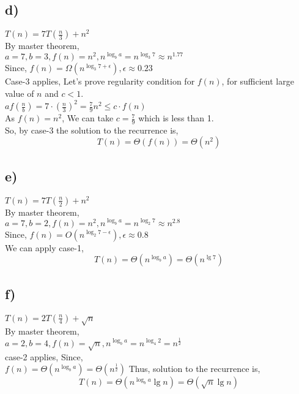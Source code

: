 \documentclass[a4paper, 11pt]{article}
\begin{document}
\subsection*{d)}
$T(n) =7 T(\frac{n}{3}) + n^2$\\
By master theorem,\\
$a=7, b=3, f(n) = n^2, n^{\log_{b}a}=n^{\log_{3}7} \approx n^{1.77}$\\
Since, $f(n)= \Omega(n^{\log_{3}7 + \epsilon}), \epsilon \approx 0.23$\\
Case-3 applies, Let's prove regularity condition for $f(n)$, for sufficient large value of $n$ and $c<1$.\\
$af(\frac{n}{b}) = 7\cdot(\frac{n}{3})^2 = \frac{7}{9}n^2 \le c \cdot f(n)$\\
As $f(n)=n^2$, We can take $c=\frac{7}{9}$ which is less than 1.\\
So, by case-3 the solution to the recurrence is,
$$T(n) = \Theta (f(n)) = \Theta(n^2)$$

\subsection*{e)}
$T(n) =7 T(\frac{n}{2}) + n^2$\\
By master theorem,\\
$a=7, b=2, f(n) = n^2, n^{\log_{b}a}=n^{\log_{2}7} \approx n^{2.8}$\\
Since, $f(n)=O(n^{\log_{2}7 - \epsilon}), \epsilon \approx 0.8$\\
We can apply case-1,
$$T(n) = \Theta (n^{\log_{b}a}) = \Theta(n^{\lg 7})$$

\subsection*{f)}
$T(n) =2 T(\frac{n}{4}) + \sqrt{n}$\\
By master theorem,\\
$a=2, b=4, f(n) = \sqrt{n}, n^{\log_{b}a}=n^{\log_{4}2} = n^{\frac{1}{2}}$\\
case-2 applies, Since,\\
$f(n)= \Theta(n^{\log_{b}a}) = \Theta(n^\frac{1}{2})$
Thus, solution to the recurrence is,
$$T(n) = \Theta (n^{\log_{b}a} \lg n) = \Theta (\sqrt{n} \lg n)$$
\end{document}
